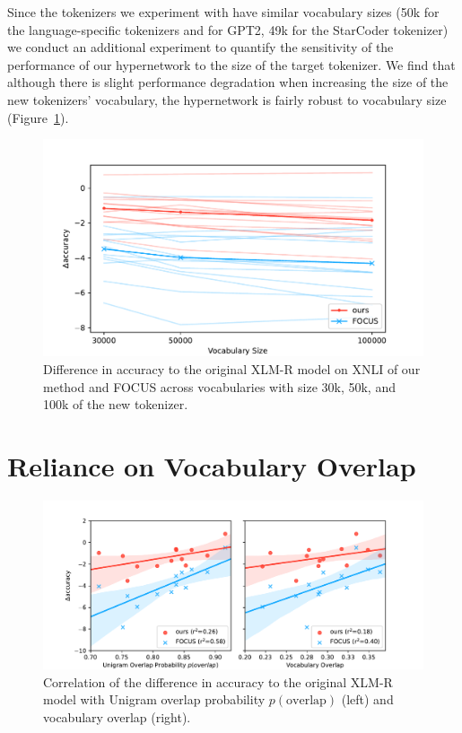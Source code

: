 \documentclass{article}
\begin{document}
Since the tokenizers we experiment with have similar vocabulary sizes (50k for the language-specific tokenizers and for GPT2, 49k for the StarCoder tokenizer) we conduct an additional experiment to quantify the sensitivity of the performance of our hypernetwork to the size of the target tokenizer. We find that although there is slight performance degradation when increasing the size of the new tokenizers' vocabulary, the hypernetwork is fairly robust to vocabulary size (Figure~\ref{fig:vocabulary_size_sensitivity}).

\begin{figure}[h]
    \centering
    \includegraphics[width=0.7\linewidth]{figures/vocabulary_size_sensitivity.pdf}
    \caption{Difference in accuracy to the original XLM-R model on XNLI of our method and FOCUS across vocabularies with size 30k, 50k, and 100k of the new tokenizer.}
    \label{fig:vocabulary_size_sensitivity}
\end{figure}

\section{Reliance on Vocabulary Overlap}

\begin{figure}[h]
    \centering
    \includegraphics[width=0.7\linewidth]{figures/overlap_correlation.pdf}
    \caption{Correlation of the difference in accuracy to the original XLM-R model with Unigram overlap probability $p(\text{overlap})$ (left) and vocabulary overlap (right).}
    \label{fig:overlap_correlation}
\end{figure}
\end{document}
